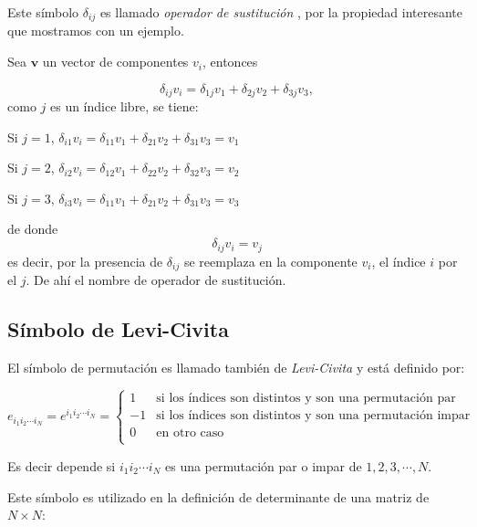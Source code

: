 \bigskip


Este símbolo $\delta_{ij}$ es llamado \textit{operador de sustitución }, por la propiedad interesante que mostramos con un ejemplo.

Sea $\mathbf{v}$ un vector de componentes $v_i$, entonces

$$ \delta_{ij}v_i= \delta_{1j}v_1  +  \delta_{2j}v_2  +  \delta_{3j}v_3, $$
\noindent
como $j$ es un índice libre, se tiene:
\bigskip

Si $j=1$, $\delta_{i1}v_i= \delta_{11}v_1  +  \delta_{21}v_2  +  \delta_{31}v_3 =v_1 $

Si $j=2$, $\delta_{i2}v_i= \delta_{12}v_1  +  \delta_{22}v_2  +  \delta_{32}v_3 =v_2 $


Si $j=3$, $\delta_{i3}v_i= \delta_{11}v_1  +  \delta_{21}v_2  +  \delta_{31}v_3 =v_3 $

\noindent
de donde 
$$  \delta_{ij}v_i= v_j$$
\noindent
es decir, por la presencia de $\delta_{ij}$ se reemplaza en la componente $v_i$, el índice $i$ por el $j$. De ahí el nombre de operador de sustitución.

\subsection{Símbolo de Levi-Civita}


El símbolo de permutación es llamado también de \textit{Levi-Civita} y está definido por:




\begin{equation}
\label{Levi}
 e_{i_1 i_2  \cdots i_N}=e^{i_1 i_2  \cdots i_N}=
\left\{ \begin{array} {lll} 
                    1 & \mbox{si los índices son distintos y son una permutación par}
\\
                    -1 & \mbox{si los índices son distintos y son una permutación  impar}\\
										 0 & \mbox{en otro caso} \\
                    
                   \end{array}
           \right.
\end{equation}

Es decir depende si  ${i_1 i_2 \cdots i_N}$   es una permutación par o impar de $1, 2, 3, \cdots,  N$.


Este símbolo es utilizado en la definición de determinante de una matriz de $N \times N$:


